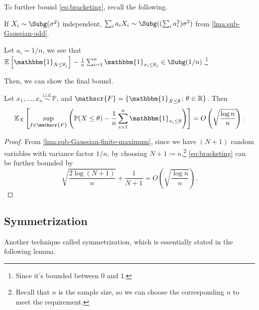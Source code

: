 To further bound \autoref{eq:bracketing}, recall the following.

\begin{prev}
	If \(X_i \sim \Subg(\sigma ^2) \) independent, \(\sum_{i} a_i X_i \sim \Subg((\sum_{i} a_i^2) \sigma ^2) \) from \autoref{lma:sub-Gaussian-add}.
\end{prev}

\begin{remark}
	Let \(a_i = 1/n\), we see that \(\mathbb{E}_{}\left[\mathbbm{1}_{X \leq \theta _j}\right] - \frac{1}{n} \sum_{i=1}^{n} \mathbbm{1}_{x_i \leq \theta _j} \in \Subg(1 / n) \).\footnote{Since it's bounded between \(0\) and \(1\).}
\end{remark}

Then, we can show the final bound.

\begin{proposition}[Bracketing]\label{prop:bracketing}
	Let \(x_1, \dots , x_n \overset{\text{i.i.d.} }{\sim } \mathbb{P} \), and \(\mathscr{F} = \{ \mathbbm{1}_{X \leq \theta} \colon \theta \in \mathbb{R} \} \). Then
	\[
		\mathbb{E}_{X}\left[ \sup _{f\in \mathscr{F} } \left( \mathbb{P} (X \leq \theta ) - \frac{1}{n}\sum_{i=1}^{n} \mathbbm{1}_{x_i \leq \theta } \right) \right] = O\left( \sqrt{\frac{\log n}{n}}  \right).
	\]
\end{proposition}
\begin{proof}
	From \autoref{lma:sub-Gaussian-finite-maximum}, since we have \((N+1)\) random variables with variance factor \(1 / n\), by choosing \(N+1 \coloneqq n\),\footnote{Recall that \(n\) is the sample size, so we can choose the corresponding \(n\) to meet the requirement.} \autoref{eq:bracketing} can be further bounded by
	\[
		\sqrt{\frac{2 \log (N+1)}{n}} + \frac{1}{N+1} = O\left( \sqrt{\frac{\log n}{n}}  \right).
	\]
\end{proof}
\subsection{Symmetrization}
Another technique called symmetrization, which is essentially stated in the following lemma.

